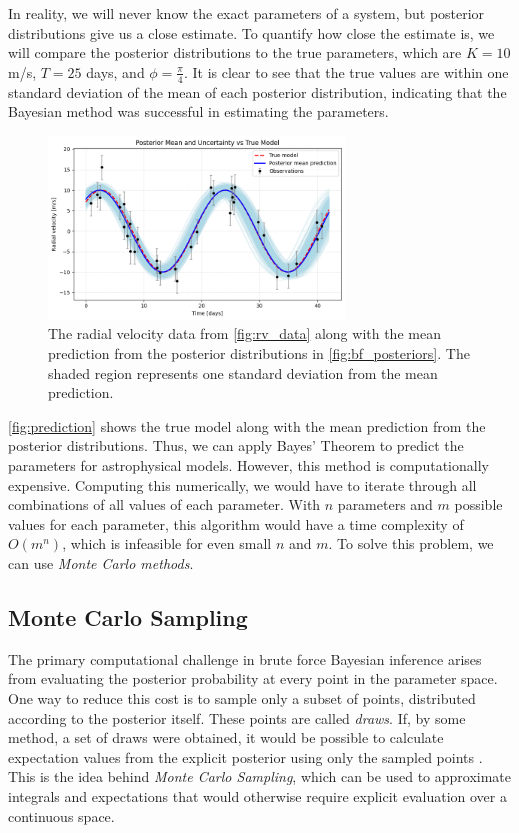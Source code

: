 \documentclass[preprint,longauthor]{aastex631}
\numberwithin{equation}{section}
\begin{document}
In reality, we will never know the exact parameters of a system, but posterior distributions give us a close estimate. To quantify how close the estimate is, we will compare the posterior distributions to the true parameters, which are $K=10$ m/s, $T=25$ days, and $\phi=\frac{\pi}{4}$. It is clear to see that the true values are within one standard deviation of the mean of each posterior distribution, indicating that the Bayesian method was successful in estimating the parameters.

\begin{figure}[ht!]
\centering
\includegraphics[width=0.7\textwidth]{../scripts/2.2/figures/prediction.png}
\caption{The radial velocity data from \autoref{fig:rv_data} along with the mean prediction from the posterior distributions in \autoref{fig:bf_posteriors}. The shaded region represents one standard deviation from the mean prediction.}
\label{fig:prediction}
\end{figure}

\autoref{fig:prediction} shows the true model along with the mean prediction from the posterior distributions. Thus, we can apply Bayes' Theorem to predict the parameters for astrophysical models. However, this method is computationally expensive. Computing this numerically, we would have to iterate through all combinations of all values of each parameter. With $n$ parameters and $m$ possible values for each parameter, this algorithm would have a time complexity of $O(m^n)$, which is infeasible for even small $n$ and $m$. To solve this problem, we can use \textit{Monte Carlo methods}.

\subsection{Monte Carlo Sampling}
The primary computational challenge in brute force Bayesian inference arises from evaluating the posterior probability at every point in the parameter space. One way to reduce this cost is to sample only a subset of points, distributed according to the posterior itself. These points are called \textit{draws}. If, by some method, a set of draws were obtained, it would be possible to calculate expectation values from the explicit posterior using only the sampled points \citep{vontoussaintBayesianInferencePhysics2011}. This is the idea behind \textit{Monte Carlo Sampling}, which can be used to approximate integrals and expectations that would otherwise require explicit evaluation over a continuous space.
\end{document}
